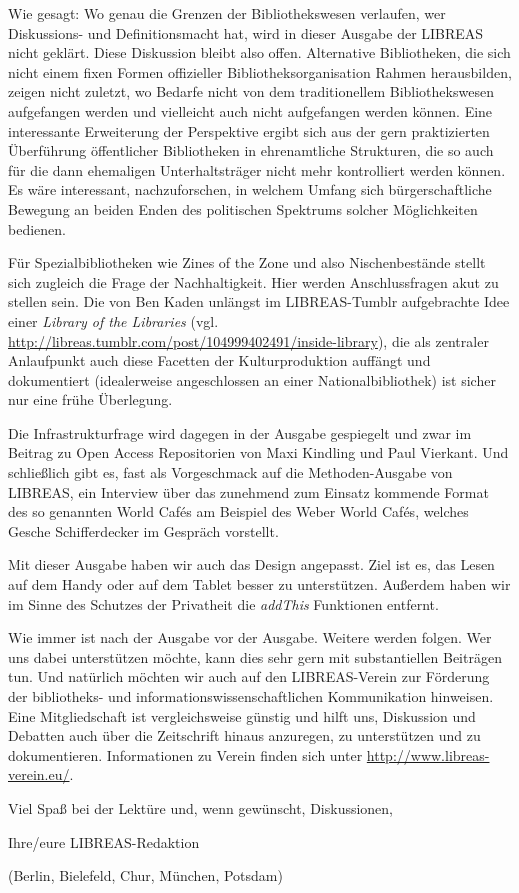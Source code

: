 \documentclass[a4paper,
fontsize=11pt,
oneside,
numbers=noperiodatend,
parskip=half-,
bibliography=totoc,
final
]{scrartcl}
\begin{document}
Wie gesagt: Wo genau die Grenzen der Bibliothekswesen verlaufen, wer
Diskussions- und Definitionsmacht hat, wird in dieser Ausgabe der
LIBREAS nicht geklärt. Diese Diskussion bleibt also offen. Alternative
Bibliotheken, die sich nicht einem fixen Formen offizieller
Bibliotheksorganisation Rahmen herausbilden, zeigen nicht zuletzt, wo
Bedarfe nicht von dem traditionellem Bibliothekswesen aufgefangen werden
und vielleicht auch nicht aufgefangen werden können. Eine interessante
Erweiterung der Perspektive ergibt sich aus der gern praktizierten
Überführung öffentlicher Bibliotheken in ehrenamtliche Strukturen, die
so auch für die dann ehemaligen Unterhaltsträger nicht mehr kontrolliert
werden können. Es wäre interessant, nachzuforschen, in welchem Umfang
sich bürgerschaftliche Bewegung an beiden Enden des politischen
Spektrums solcher Möglichkeiten bedienen.

Für Spezialbibliotheken wie Zines of the Zone und also Nischenbestände
stellt sich zugleich die Frage der Nachhaltigkeit. Hier werden
Anschlussfragen akut zu stellen sein. Die von Ben Kaden unlängst im
LIBREAS-Tumblr aufgebrachte Idee einer \emph{Library of the Libraries}
(vgl. \url{http://libreas.tumblr.com/post/104999402491/inside-library}),
die als zentraler Anlaufpunkt auch diese Facetten der Kulturproduktion
auffängt und dokumentiert (idealerweise angeschlossen an einer
Nationalbibliothek) ist sicher nur eine frühe Überlegung.

Die Infrastrukturfrage wird dagegen in der Ausgabe gespiegelt und zwar
im Beitrag zu Open Access Repositorien von Maxi Kindling und Paul
Vierkant. Und schließlich gibt es, fast als Vorgeschmack auf die
Methoden-Ausgabe von LIBREAS, ein Interview über das zunehmend zum
Einsatz kommende Format des so genannten World Cafés am Beispiel des
Weber World Cafés, welches Gesche Schifferdecker im Gespräch vorstellt.

Mit dieser Ausgabe haben wir auch das Design angepasst. Ziel ist es, das
Lesen auf dem Handy oder auf dem Tablet besser zu unterstützen. Außerdem
haben wir im Sinne des Schutzes der Privatheit die \emph{addThis}
Funktionen entfernt.

Wie immer ist nach der Ausgabe vor der Ausgabe. Weitere werden folgen.
Wer uns dabei unterstützen möchte, kann dies sehr gern mit
substantiellen Beiträgen tun. Und natürlich möchten wir auch auf den
LIBREAS-Verein zur Förderung der bibliotheks- und
informationswissenschaftlichen Kommunikation hinweisen. Eine
Mitgliedschaft ist vergleichsweise günstig und hilft uns, Diskussion und
Debatten auch über die Zeitschrift hinaus anzuregen, zu unterstützen und
zu dokumentieren. Informationen zu Verein finden sich unter
\url{http://www.libreas-verein.eu/}.

Viel Spaß bei der Lektüre und, wenn gewünscht, Diskussionen,

Ihre/eure LIBREAS-Redaktion

(Berlin, Bielefeld, Chur, München, Potsdam)

\end{document}
